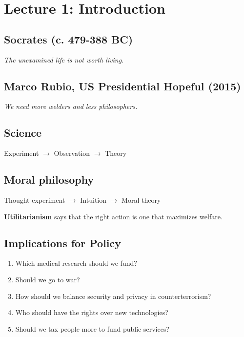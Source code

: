 
\section{Lecture 1: Introduction}

\subsection{Socrates (c. 479-388 BC)}

\textit{The unexamined life is not worth living.}

\subsection{Marco Rubio, US Presidential Hopeful (2015)}

\textit{We need more welders and less philosophers.}

\subsection{Science}

Experiment $\rightarrow$ Observation $\rightarrow$ Theory

\subsection{Moral philosophy}

Thought experiment $\rightarrow$ Intuition $\rightarrow$ Moral theory

\textbf{Utilitarianism} says that the right action is one that maximizes
welfare.

\subsection{Implications for Policy}

\begin{enumerate}
    \item Which medical research should we fund?
    \item Should we go to war?
    \item How should we balance security and privacy in counterterrorism?
    \item Who should have the rights over new technologies?
    \item Should we tax people more to fund public services?
\end{enumerate}

